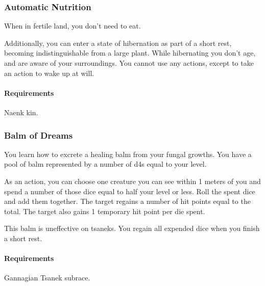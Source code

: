 \subsubsection{Automatic Nutrition} \label{feat::automaticnutrition}
    When in fertile land, you don't need to eat.

    Additionally, you can enter a state of hibernation as part of a short rest, becoming indistinguishable from a large plant.
    While hibernating you don't age, and are aware of your surroundings.
    You cannot use any actions, except to take an action to wake up at will.
    \paragraph{Requirements} Naenk kin.
\subsubsection{Balm of Dreams} \label{feat::balmofdreams}
    You learn how to excrete a healing balm from your fungal growths.
    You have a pool of balm represented by a number of d4s equal to your level.

    As an action, you can choose one creature you can see within 1 meters of you and spend a number of those dice equal to half your level or less.
    Roll the spent dice and add them together.
    The target regains a number of hit points equal to the total.
    The target also gains 1 temporary hit point per die spent.

    This balm is uneffective on tsaneks.
    You regain all expended dice when you finish a short rest.
    \paragraph{Requirements} Gannagian Tsanek subrace.
